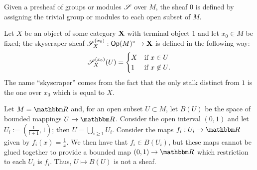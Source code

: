 \begin{ej}
Given a presheaf of groups or modules $\mathscr{S}$ over $M$, the sheaf $0$ is defined by assigning the trivial group or modules to each open subset of $M$.
\end{ej}

\begin{ej}
Let $X$ be an object of some category ${\bf X}$ with terminal object $1$ and let $x_0\in M$ be fixed; the skyscraper sheaf $\mathscr{S}^{(x_0)}_X:\mathsf{Op}(M)^\circ \to {\bf X}$ is defined in the following way:
$$
\mathscr{S}^{(x_0)}_X(U)=
\begin{cases}
X & \text{if $x\in U$} \\
1 & \text{if $x\not \in U$.} \\
\end{cases}
$$
The name ``skyscraper'' comes from the fact that the only stalk distinct from $1$ is the one over $x_0$ which is equal to $X$.
\end{ej}

\begin{ej}\label{bounded}
Let $M=\re$ and, for an open subset $U\subset M$, let $B(U)$ be the space of bounded mappings $U\to \re$. Consider the open interval $(0,1)$ and let $U_i:=\left (\frac{1}{i+1},1 \right )$; then $U=\bigcup_{i\geqslant 1}U_i$. Consider the maps $f_i:U_i\to \re$ given by $f_i(x)=\frac{1}{x}$. We then have that $f_i\in B(U_i)$, but these maps cannot be glued together to provide a bounded map $(0,1)\to \re$ which restriction to each $U_i$ is $f_i$. Thus, $U\mapsto B(U)$ is not a sheaf.
\end{ej}

